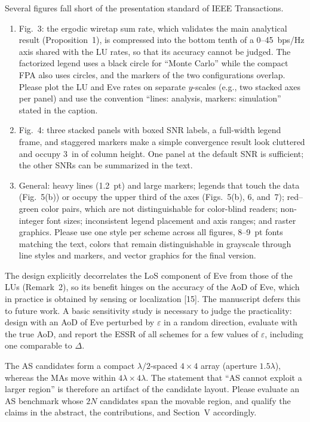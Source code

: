 \documentclass[10pt,a4paper]{article}
\begin{document}
\begin{description}[leftmargin=0pt]
\item[M2 (Figure quality).] Several figures fall short of the presentation standard of IEEE Transactions.
\begin{enumerate}[label=\alph*)]
\item Fig.~3: the ergodic wiretap sum rate, which validates the main analytical result (Proposition~1), is compressed into the bottom tenth of a 0--45~bps/Hz axis shared with the LU rates, so that its accuracy cannot be judged. The factorized legend uses a black circle for ``Monte Carlo'' while the compact FPA also uses circles, and the markers of the two configurations overlap. Please plot the LU and Eve rates on separate $y$-scales (e.g., two stacked axes per panel) and use the convention ``lines: analysis, markers: simulation'' stated in the caption.
\item Fig.~4: three stacked panels with boxed SNR labels, a full-width legend frame, and staggered markers make a simple convergence result look cluttered and occupy 3~in of column height. One panel at the default SNR is sufficient; the other SNRs can be summarized in the text.
\item General: heavy lines (1.2~pt) and large markers; legends that touch the data (Fig.~5(b)) or occupy the upper third of the axes (Figs.~5(b), 6, and~7); red--green color pairs, which are not distinguishable for color-blind readers; non-integer font sizes; inconsistent legend placement and axis ranges; and raster graphics. Please use one style per scheme across all figures, 8--9~pt fonts matching the text, colors that remain distinguishable in grayscale through line styles and markers, and vector graphics for the final version.
\end{enumerate}

\item[M3 (Robustness to imperfect statistical CSI of Eve).] The design explicitly decorrelates the LoS component of Eve from those of the LUs (Remark~2), so its benefit hinges on the accuracy of the AoD of Eve, which in practice is obtained by sensing or localization [15]. The manuscript defers this to future work. A basic sensitivity study is necessary to judge the practicality: design with an AoD of Eve perturbed by $\varepsilon$ in a random direction, evaluate with the true AoD, and report the ESSR of all schemes for a few values of $\varepsilon$, including one comparable to $\Delta$.

\item[M4 (Strength of the AS benchmark).] The AS candidates form a compact $\lambda/2$-spaced $4\times4$ array (aperture $1.5\lambda$), whereas the MAs move within $4\lambda\times4\lambda$. The statement that ``AS cannot exploit a larger region'' is therefore an artifact of the candidate layout. Please evaluate an AS benchmark whose $2N$ candidates span the movable region, and qualify the claims in the abstract, the contributions, and Section~V accordingly.


\end{description}
\end{document}
